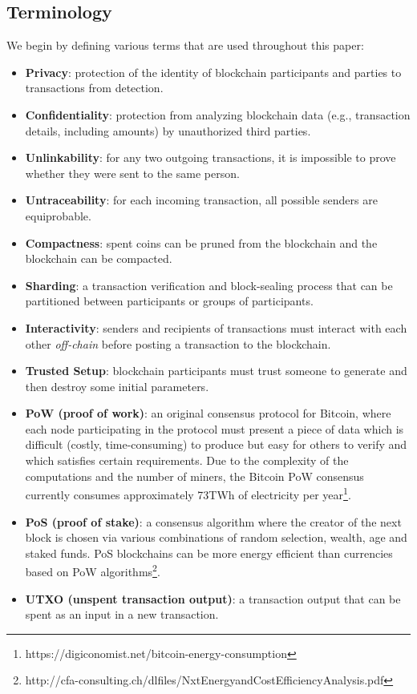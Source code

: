 \documentclass[a4paper, 10pt, conference]{ieeeconf}
\begin{document}
\subsection{Terminology}
We begin by defining various terms that are used throughout this paper:

\begin{itemize}
	\item \textbf{Privacy}: protection of the identity of blockchain participants and parties to transactions from detection.
	\item \textbf{Confidentiality}: protection from analyzing blockchain data (e.g., transaction details, including amounts) by unauthorized third parties.
	\item \textbf{Unlinkability}: for any two outgoing transactions, it is impossible to prove whether they were sent to the same person\cite{c2}.
	\item \textbf{Untraceability}: for each incoming transaction, all possible senders are equiprobable\cite{c2}.
	\item \textbf{Compactness}: spent coins can be pruned from the blockchain and the blockchain can be compacted.
	\item \textbf{Sharding}: a transaction verification and block-sealing process that can be partitioned between participants or groups of participants.
	\item \textbf{Interactivity}: senders and recipients of transactions must interact with each other \textit{off-chain} before posting a transaction to the blockchain.
	\item \textbf{Trusted Setup}: blockchain participants must trust someone to generate and then destroy some initial parameters.
	\item \textbf{PoW (proof of work)}: an original consensus protocol for Bitcoin, where each node participating in the protocol must present a piece of data which is difficult (costly, time-consuming) to produce but easy for others to verify and which satisfies certain requirements. Due to the complexity of the computations and the number of miners, the Bitcoin PoW consensus currently consumes approximately 73TWh of electricity per year\footnote{https://digiconomist.net/bitcoin-energy-consumption}.
	\item \textbf{PoS (proof of stake)}: a consensus algorithm where the creator of the next block is chosen via various combinations of random selection, wealth, age and staked funds. PoS blockchains can be more energy efficient than currencies based on PoW algorithms\footnote{http://cfa-consulting.ch/dlfiles/NxtEnergyandCostEfficiencyAnalysis.pdf}.
	\item \textbf{UTXO (unspent transaction output)}: a transaction output that can be spent as an input in a new transaction.
\end{itemize}
\end{document}
